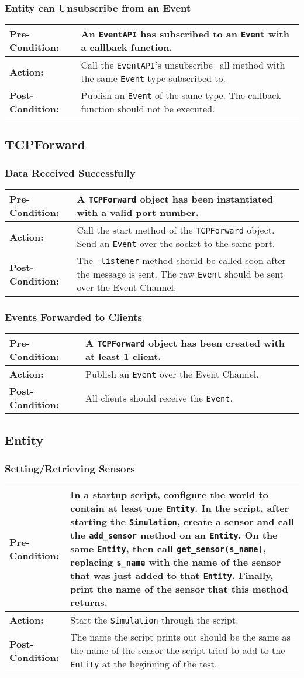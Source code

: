 \documentclass[titlepage]{article}
\newcommand{\testcase}[3]{
    \begin{center}
    \begin{tabular}{| l | p{0.7\textwidth}|}
        \hline
        \rowcolor[gray]{0.8}\textbf{Pre-Condition:} & #1 \\ \hline
        \textbf{Action:} & #2 \\ \hline
        \rowcolor[gray]{0.8}\textbf{Post-Condition:} & #3 \\ \hline
    \end{tabular}
    \end{center}
}
\begin{document}
\subsubsection{Entity can Unsubscribe from an Event}
\testcase{An \texttt{EventAPI} has subscribed to an \texttt{Event} with a callback function.}{Call the \texttt{EventAPI}'s unsubscribe\_all method with the same \texttt{Event} type subscribed to.}{Publish an \texttt{Event} of the same type. The callback function should not be executed.}

\subsection{TCPForward}
\subsubsection{Data Received Successfully}
\testcase{A \texttt{TCPForward} object has been instantiated with a valid port number.}{Call the start method of the \texttt{TCPForward} object. Send an \texttt{Event} over the socket to the same port. }{The \texttt{\_listener} method should be called soon after the message is sent. The raw \texttt{Event} should be sent over the Event Channel. }

\subsubsection{Events Forwarded to Clients}
\testcase{A \texttt{TCPForward} object has been created with at least 1 client.}{Publish an \texttt{Event} over the Event Channel.}{All clients should receive the \texttt{Event}.}

\subsection{Entity}
\subsubsection{Setting/Retrieving Sensors}
\testcase{In a startup script, configure the world to contain at least one \texttt{Entity}. In the script, after starting the \texttt{Simulation}, create a sensor and call the \texttt{add\_sensor} method on an \texttt{Entity}.  On the same \texttt{Entity}, then call \texttt{get\_sensor(s\_name)}, replacing \texttt{s\_name} with the name of the sensor that was just added to that \texttt{Entity}.  Finally, print the name of the sensor that this method returns.}{Start the \texttt{Simulation} through the script.}{The name the script prints out should be the same as the name of the sensor the script tried to add to the \texttt{Entity} at the beginning of the test.}
\end{document}
